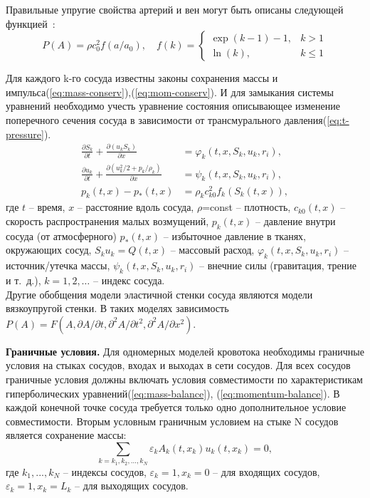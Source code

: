 Правильные упругие свойства артерий и вен могут быть описаны следующей функцией~\cite{holodov:2001}:
\begin{equation}
    \label{eq:elastic-propeties}
    P(A)=\rho c^2_0 f(a/a_0), 
    \quad
    f(k)=\begin{cases}
    \exp(k-1)-1, &k>1 \\ \ln(k), &k \leq 1
    \end{cases}
\end{equation}

Для каждого k-го сосуда известны законы сохранения массы и импульса(\ref{eq:mass-conserv}),(\ref{eq:mom-conserv}). 
И для замыкания системы уравнений необходимо учесть уравнение состояния описывающее изменение поперечного сечения сосуда в зависимости 
от трансмурального давления(\ref{eq:t-pressure}).
\begin{align}
    \label{eq:mass-conserv}
    \frac{\partial S_k}{ \partial t} + \frac{\partial(u_kS_k)}{\partial x}&=\varphi _k(t,x,S_k,u_k,r_i),\\
    \label{eq:mom-conserv}
    \frac{\partial u_k}{\partial t} + \frac{\partial(u_k^2/2+p_k/\rho_k)}{\partial x}&= \psi_k(t,x,S_k,u_k,r_i),\\
    \label{eq:t-pressure}
    p_k(t,x)-p_*(t,x)&=\rho_k c^2_{k0}f_k(S_k(t,x)),
\end{align}
где $t$ -- время, $x$ -- расстояние вдоль сосуда, $\rho$=const -- плотность, $c_{k0}(t,x)$ -- скорость распространения малых возмущений,
  $p_k(t,x)$ -- давление внутри сосуда (от атмосферного) $p_*(t,x)$ -- избыточное давление в тканях, окружающих сосуд, 
  $S_ku_k=Q(t,x)$ -- массовый расход, $\varphi _k(t,x,S_k,u_k,r_i)$ -- источник/утечка массы, $\psi_k(t,x,S_k,u_k,r_i)$ -- внечние силы (гравитация, трение и т.~д.),
  $k=1,2,\ldots$ -- индекс сосуда.
\\ 
Другие обобщения модели эластичной стенки сосуда являются модели вязкоупругой стенки. В таких моделях зависимость 
$
P(A)=F(A,\partial {A} / \partial {t},\partial^2{A} / \partial {t^2},\partial^2{A} / \partial {x^2})
$.

{\bf Граничные условия.}
Для одномерных моделей кровотока необходимы граничные условия на стыках сосудов, входах и выходах в сети сосудов. 
Для всех сосудов граничные условия должны включать условия совместимости по характеристикам гиперболических уравнений(\ref{eq:mass-balance}), (\ref{eq:momentum-balance}).
В каждой конечной точке сосуда требуется только одно дополнительное условие совместимости.
Вторым условным граничным условием на стыке N сосудов является сохранение массы:
\begin{equation}
    \label{eq:conserv-mass}
    \sum_{k=k_1,k_2,...,k_N} \varepsilon_k A_k(t,x_k)u_k(t,x_k)=0,
\end{equation}
где {$k_1,...,k_N$} -- индексы сосудов, $\varepsilon_k=1, x_k=0$ -- для входящих сосудов, 
$\varepsilon_k=1, x_k=L_k$ -- для выходящих сосудов.

